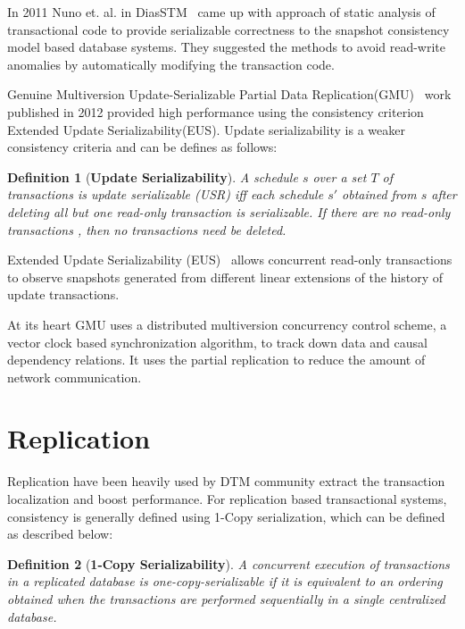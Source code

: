 \documentclass[12pt,english]{report}
\newtheorem{definition}{Definition}[section]
\begin{document}
In 2011 Nuno et. al. in DiasSTM~\cite{dias2011efficient} came up with approach of static analysis of transactional code to provide serializable correctness to the snapshot consistency model based database systems. They suggested the methods to avoid read-write anomalies by automatically modifying the transaction code.

Genuine Multiversion Update-Serializable Partial Data Replication(GMU)~\cite{GMU:peluso2012scalability} work published in 2012 provided high performance using the consistency criterion Extended Update Serializability(EUS). Update serializability is a weaker consistency criteria and can be defines as follows:

\begin{definition}[\textbf{Update Serializability}]
A schedule $s$ over a set $T$ of transactions is update serializable (USR) iff each schedule $s'$ obtained from $s$ after deleting all but one read-only transaction is serializable. If there are no read-only transactions , then no transactions need be deleted.
\end{definition}

Extended Update Serializability (EUS)~\cite{EUS:HansdahPatnaik} allows concurrent read-only transactions to observe snapshots generated from different linear extensions of the history of update transactions.

At its heart GMU uses a distributed multiversion concurrency control scheme, a vector clock based synchronization algorithm, to track down data and causal dependency relations. It uses the partial replication to reduce the amount of network communication. 


\section{Replication}
Replication have been heavily used by DTM community extract the transaction localization and boost performance. For replication based transactional systems, consistency is generally defined using 1-Copy serialization, which can be defined as described below:

\begin{definition}[\textbf{1-Copy Serializability}]
A concurrent execution of transactions in a replicated database is one-copy-serializable if it is equivalent  to an ordering obtained when the transactions are performed sequentially in a single centralized database.~\cite{bornea2011one}
\end{definition}
\end{document}
